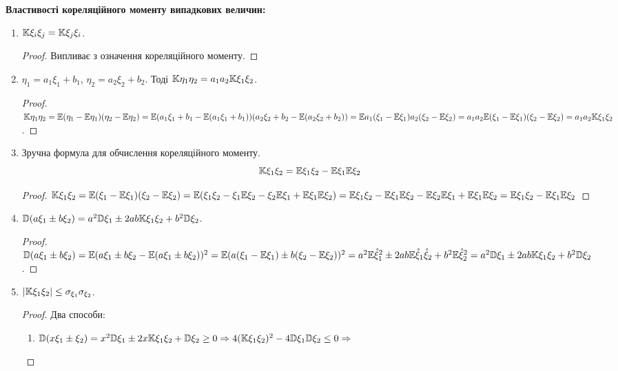 \noindent \textbf{Властивості кореляційного моменту випадкових 
величин:}
\begin{enumerate}
    \item $\mathbb{K}\xi_i\xi_j = \mathbb{K}\xi_j\xi_i$.
    \begin{proof}
        Випливає з означення кореляційного моменту.
    \end{proof}
    \item $\eta_1 = a_1\xi_1 + b_1$, $\eta_2 = a_2\xi_2 + b_2$.
    Тоді $\mathbb{K}\eta_1\eta_2 = a_1a_2\mathbb{K}\xi_1\xi_2$.
    \begin{proof}
        $\mathbb{K}\eta_1\eta_2 = \mathbb{E}(\eta_1 - \mathbb{E}\eta_1)(\eta_2 - \mathbb{E}\eta_2) = 
        \mathbb{E}(a_1\xi_1 + b_1 - \mathbb{E}(a_1\xi_1 + b_1))
        (a_2\xi_2 + b_2 - \mathbb{E}(a_2\xi_2 + b_2)) = 
        \mathbb{E} a_1(\xi_1 - \mathbb{E}\xi_1)a_2(\xi_2 - \mathbb{E}\xi_2) = 
        a_1a_2\mathbb{E}(\xi_1 - \mathbb{E}\xi_1)(\xi_2 - \mathbb{E}\xi_2) = 
        a_1a_2\mathbb{K}\xi_1\xi_2$.
    \end{proof}

    \item Зручна формула для обчислення кореляційного моменту.
    \begin{equation}
        \mathbb{K}\xi_1\xi_2 = \mathbb{E}\xi_1\xi_2 - \mathbb{E}\xi_1 \mathbb{E}\xi_2
    \end{equation}
    \begin{proof}
        $\mathbb{K}\xi_1\xi_2 = \mathbb{E}(\xi_1 - \mathbb{E}\xi_1)(\xi_2 - \mathbb{E}\xi_2) = 
        \mathbb{E}(\xi_1\xi_2 - \xi_1\mathbb{E}\xi_2 - \xi_2\mathbb{E}\xi_1 + \mathbb{E}\xi_1\mathbb{E}\xi_2) = 
        \mathbb{E}\xi_1\xi_2 - \mathbb{E}\xi_1\mathbb{E}\xi_2 - \mathbb{E}\xi_2\mathbb{E}\xi_1 + \mathbb{E}\xi_1\mathbb{E}\xi_2 = 
        \mathbb{E}\xi_1\xi_2 - \mathbb{E}\xi_1\mathbb{E}\xi_2$
    \end{proof}
    
    \item $\mathbb{D}(a\xi_1 \pm b\xi_2) = a^2\mathbb{D}\xi_1 \pm 2ab\mathbb{K}\xi_1\xi_2 + 
    b^2\mathbb{D}\xi_2$.

    \begin{proof}
        $\mathbb{D}(a\xi_1 \pm b\xi_2) = 
        \mathbb{E}(a\xi_1 \pm b\xi_2 - \mathbb{E}(a\xi_1 \pm b\xi_2))^2 =
        \mathbb{E}(a(\xi_1-\mathbb{E}\xi_1)\pm b(\xi_2 - \mathbb{E}\xi_2))^2 = 
        a^2 \mathbb{E}\mathring{\xi}_1^2 \pm 2ab\mathbb{E}\mathring{\xi}_1\mathring{\xi} _2 
        + b^2 \mathbb{E}\mathring{\xi}_2^2 = 
        a^2\mathbb{D}\xi_1 \pm 2ab\mathbb{K}\xi_1\xi_2 + b^2\mathbb{D}\xi_2$.
    \end{proof}

    \item $\left|\mathbb{K}\xi_1\xi_2\right| \leq \sigma_{\xi_1} \sigma_{\xi_2}$.
    \begin{proof}
        Два способи: 
        \begin{enumerate}[label=\Roman*.]
            \item $\mathbb{D}(x\xi_1 \pm \xi_2) = x^2 \mathbb{D}\xi_1 \pm 2x\mathbb{K}\xi_1\xi_2 + \mathbb{D}\xi_2 \geq 0 
            \Rightarrow 4(\mathbb{K}\xi_1\xi_2)^2 - 4\mathbb{D}\xi_1\mathbb{D}\xi_2 \leq 0 
            \Rightarrow $


\end{enumerate}
\end{proof}
\end{enumerate}
